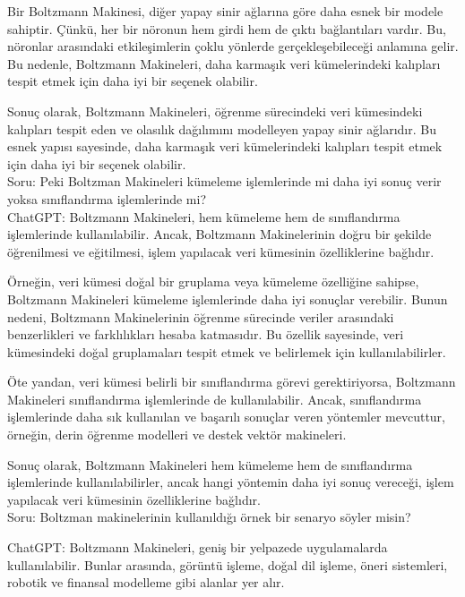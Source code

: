 \documentclass[11pt]{article}
\begin{document}
Bir Boltzmann Makinesi, diğer yapay sinir ağlarına göre daha esnek bir modele sahiptir. Çünkü, her bir nöronun hem girdi hem de çıktı bağlantıları vardır. Bu, nöronlar arasındaki etkileşimlerin çoklu yönlerde gerçekleşebileceği anlamına gelir. Bu nedenle, Boltzmann Makineleri, daha karmaşık veri kümelerindeki kalıpları tespit etmek için daha iyi bir seçenek olabilir.

Sonuç olarak, Boltzmann Makineleri, öğrenme sürecindeki veri kümesindeki kalıpları tespit eden ve olasılık dağılımını modelleyen yapay sinir ağlarıdır. Bu esnek yapısı sayesinde, daha karmaşık veri kümelerindeki kalıpları tespit etmek için daha iyi bir seçenek olabilir.\\

Soru: Peki Boltzman Makineleri kümeleme işlemlerinde mi daha iyi sonuç verir yoksa sınıflandırma işlemlerinde mi?\\

ChatGPT: Boltzmann Makineleri, hem kümeleme hem de sınıflandırma işlemlerinde kullanılabilir. Ancak, Boltzmann Makinelerinin doğru bir şekilde öğrenilmesi ve eğitilmesi, işlem yapılacak veri kümesinin özelliklerine bağlıdır.

Örneğin, veri kümesi doğal bir gruplama veya kümeleme özelliğine sahipse, Boltzmann Makineleri kümeleme işlemlerinde daha iyi sonuçlar verebilir. Bunun nedeni, Boltzmann Makinelerinin öğrenme sürecinde veriler arasındaki benzerlikleri ve farklılıkları hesaba katmasıdır. Bu özellik sayesinde, veri kümesindeki doğal gruplamaları tespit etmek ve belirlemek için kullanılabilirler.

Öte yandan, veri kümesi belirli bir sınıflandırma görevi gerektiriyorsa, Boltzmann Makineleri sınıflandırma işlemlerinde de kullanılabilir. Ancak, sınıflandırma işlemlerinde daha sık kullanılan ve başarılı sonuçlar veren yöntemler mevcuttur, örneğin, derin öğrenme modelleri ve destek vektör makineleri.

Sonuç olarak, Boltzmann Makineleri hem kümeleme hem de sınıflandırma işlemlerinde kullanılabilirler, ancak hangi yöntemin daha iyi sonuç vereceği, işlem yapılacak veri kümesinin özelliklerine bağlıdır.\\

Soru: Boltzman makinelerinin kullanıldığı örnek bir senaryo söyler misin?

ChatGPT: Boltzmann Makineleri, geniş bir yelpazede uygulamalarda kullanılabilir. Bunlar arasında, görüntü işleme, doğal dil işleme, öneri sistemleri, robotik ve finansal modelleme gibi alanlar yer alır.
\end{document}
